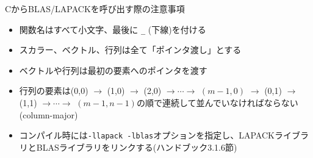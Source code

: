 \begin{frame}[t,fragile]{CからBLAS/LAPACKを呼び出す際の注意事項}
  \begin{itemize}
  \item 関数名はすべて小文字、最後に \verb+_+ (下線)を付ける
  \item スカラー、ベクトル、行列は全て「ポインタ渡し」とする
  \item ベクトルや行列は最初の要素へのポインタを渡す
  \item 行列の要素は(0,0) $\rightarrow$ (1,0) $\rightarrow$ (2,0) $\rightarrow\cdots\rightarrow$ $(m-1,0)$ $\rightarrow$ (0,1) $\rightarrow$ (1,1) $\rightarrow\cdots\rightarrow$ $(m-1,n-1)$の順で連続して並んでいなければならない(column-major)
  \item コンパイル時には{\tt -llapack -lblas}オプションを指定し、LAPACKライブラリとBLASライブラリをリンクする(ハンドブック3.1.6節)
  \end{itemize}
\end{frame}
